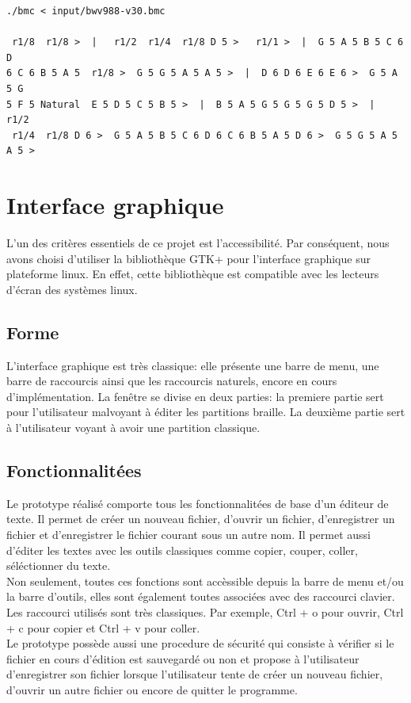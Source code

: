 \begin{verbatim}
./bmc < input/bwv988-v30.bmc 

 r1/8  r1/8 >  |   r1/2  r1/4  r1/8 D 5 >   r1/1 >  |  G 5 A 5 B 5 C 6 D 
6 C 6 B 5 A 5  r1/8 >  G 5 G 5 A 5 A 5 >  |  D 6 D 6 E 6 E 6 >  G 5 A 5 G 
5 F 5 Natural  E 5 D 5 C 5 B 5 >  |  B 5 A 5 G 5 G 5 G 5 D 5 >  |   r1/2 
 r1/4  r1/8 D 6 >  G 5 A 5 B 5 C 6 D 6 C 6 B 5 A 5 D 6 >  G 5 G 5 A 5 A 5 > 
\end{verbatim}

\section{Interface graphique}

L'un des critères essentiels de ce projet est l'accessibilité. Par
conséquent, nous avons choisi d'utiliser la bibliothèque GTK+ pour
l'interface graphique sur plateforme linux. En effet, cette
bibliothèque est compatible avec les lecteurs d'écran des systèmes
linux.


\subsection*{Forme}
L'interface graphique est très classique: elle présente une barre de
menu, une barre de raccourcis ainsi que les raccourcis naturels,
encore en cours d'implémentation. La fenêtre se divise en deux
parties: la premiere partie sert pour l'utilisateur malvoyant à éditer les partitions braille. La
deuxième partie sert à l'utilisateur voyant à avoir une partition
classique.


\subsection*{Fonctionnalitées}
Le prototype réalisé comporte tous les fonctionnalitées de base d'un
éditeur de texte. Il permet de créer un nouveau fichier, d'ouvrir un
fichier, d'enregistrer un fichier et d'enregistrer le fichier courant
sous un autre nom. Il permet aussi d'éditer les textes avec les outils
classiques comme copier, couper, coller, séléctionner du texte.
\\ Non seulement, toutes ces fonctions sont accèssible depuis la barre
de menu et/ou la barre d'outils, elles sont également toutes associées
avec des raccourci clavier. Les raccourci utilisés sont très
classiques. Par exemple, Ctrl + o pour ouvrir, Ctrl + c pour copier et
Ctrl + v pour coller.
\\ Le prototype possède aussi une procedure de
sécurité qui consiste à vérifier si le fichier en cours d'édition est
sauvegardé ou non et propose à l'utilisateur d'enregistrer son
fichier lorsque l'utilisateur tente de créer un nouveau fichier,
d'ouvrir un autre fichier ou encore de quitter le programme.





